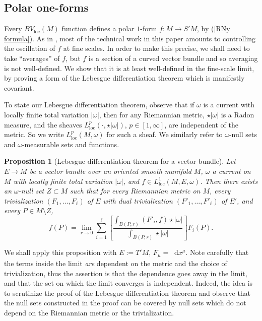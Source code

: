 \documentclass[reqno,10pt]{amsart}
\newcommand*\dif{\mathop{}\!\mathrm{d}}
\newcommand{\loc}{\mathrm{loc}}
\newtheorem{proposition}[theorem]{Proposition}
\theoremstyle{definition}
\numberwithin{equation}{section}
\begin{document}
\subsection{Polar one-forms}
Every $BV_\loc(M)$ function defines a polar $1$-form $f: M \to S'M$, by (\ref{RNy formula}).
As in \cite{Miranda66, Giusti77}, most of the technical work in this paper amounts to controlling the oscillation of $f$ at fine scales.
In order to make this precise, we shall need to take ``averages'' of $f$, but $f$ is a section of a curved vector bundle and so averaging is not well-defined.
We show that it is at least well-defined in the fine-scale limit, by proving a form of the Lebesgue differentiation theorem which is manifestly covariant.

To state our Lebesgue differentiation theorem, observe that if $\omega$ is a current with locally finite total variation $|\omega|$, then for any Riemannian metric, $\star|\omega|$ is a Radon measure, and the sheaves $L^p_\loc(\cdot, \star |\omega|)$, $p \in [1, \infty]$, are independent of the metric.
So we write $L^p_\loc(M, \omega)$ for such a sheaf.
We similarly refer to $\omega$-null sets and $\omega$-measurable sets and functions.

\begin{proposition}[Lebesgue differentiation theorem for a vector bundle]\label{LebesgueDiff}
Let $E \to M$ be a vector bundle over an oriented smooth manifold $M$, $\omega$ a current on $M$ with locally finite total variation $|\omega|$, and $f \in L^1_\loc(M, E, \omega)$.
Then there exists an $\omega$-null set $Z \subset M$ such that for every Riemannian metric on $M$, every trivialization $(F_1, \dots, F_\ell)$ of $E$ with dual trivialization $(F'_1, \dots, F'_\ell)$ of $E'$, and every $P \in M \setminus Z$,
$$f(P) = \lim_{r \to 0} \sum_{i=1}^\ell \left[\frac{\int_{B(P, r)} (F'_i, f) \star |\omega|}{\int_{B(P, r)} \star |\omega|}\right] F_i(P).$$
\end{proposition}

We shall apply this proposition with $E := T'M$, $F_\mu = \dif x^\mu$. 
Note carefully that the terms inside the limit \emph{are} dependent on the metric and the choice of trivialization, thus the assertion is that the dependence goes away in the limit, and that the set on which the limit converges is independent.
Indeed, the idea is to scrutinize the proof of the Lebesgue differentiation theorem \cite[Chapter 3, Theorem 1.3]{stein2009real} and observe that the null sets constructed in the proof can be covered by null sets which do not depend on the Riemannian metric or the trivialization.
\end{document}
